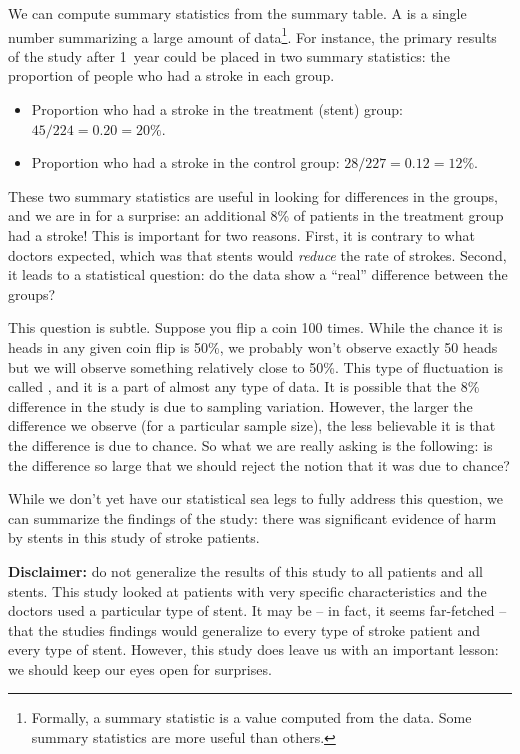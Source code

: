 We can compute summary statistics from the summary table. A  is a single number summarizing a large amount of data\footnote{Formally, a summary statistic is a value computed from the data. Some summary statistics are more useful than others.}. For instance, the primary results of the study after 1~year could be placed in two summary statistics: the proportion of people who had a stroke in each group. %
\begin{itemize}
\setlength{\itemsep}{0mm}
\item[] Proportion who had a stroke in the treatment (stent) group: $45/224 = 0.20 = 20\%$.
\item[] Proportion who had a stroke in the control group: $28/227 = 0.12 = 12\%$.
\end{itemize}
These two summary statistics are useful in looking for differences in the groups, and we are in for a surprise: an additional 8\% of patients in the treatment group had a stroke! This is important for two reasons. First, it is contrary to what doctors expected, which was that stents would \emph{reduce} the rate of strokes. Second, it leads to a statistical question: do the data show a ``real'' difference between the groups?

This question is subtle. Suppose you flip a coin 100 times. While the chance it is heads in any given coin flip is 50\%, we probably won't observe exactly 50 heads but we will observe something relatively close to 50\%. This type of fluctuation is called , and it is a part of almost any type of data. It is possible that the 8\% difference in the study is due to sampling variation. However, the larger the difference we observe (for a particular sample size), the less believable it is that the difference is due to chance. So what we are really asking is the following: is the difference so large that we should reject the notion that it was due to chance?

While we don't yet have our statistical sea legs to fully address this question, we can summarize the findings of the study: there was significant evidence of harm by stents in this study of stroke patients.

\textbf{Disclaimer:} do not generalize the results of this study to all patients and all stents. This study looked at patients with very specific characteristics and the doctors used a particular type of stent. It may be -- in fact, it seems far-fetched -- that the studies findings would generalize to every type of stroke patient and every type of stent. However, this study does leave us with an important lesson: we should keep our eyes open for surprises. %

